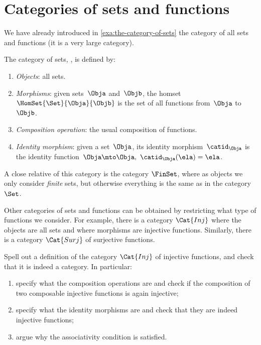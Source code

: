 
\section{Categories of sets and functions}

We have already introduced in \cref{exa:the-category-of-sets} the category of all sets and functions (it is a very large category).

\begin{ctdefinition}
    \label{def:Set}
    The category of sets, \iindex{\Set}, is defined by:
    \begin{enumerate}
        \item \emph{Objects}: all sets.
        \item \emph{Morphisms}: given sets~$\Obja$ and~$\Objb$, the homset~$\HomSet{\Set}{\Obja}{\Objb}$ is the set of all functions from~$\Obja$ to~$\Objb$.
        \item \emph{Composition operation}: the usual composition of functions.
        \item \emph{Identity morphism}: given a set~$\Obja$, its identity morphism~$\catid_\Obja$ is the identity function~$\Obja \mto \Obja, \ \catid_\Obja(\ela) = \ela$.
    \end{enumerate}
\end{ctdefinition}

A close relative of this category is the category $\FinSet$, where as objects we only consider \emph{finite} sets, but otherwise everything is the same as in the category $\Set$.

Other categories of sets and functions can be obtained by restricting what type of functions we consider.
For example, there is a category $\Cat{Inj}$ where the objects are all sets and where morphisms are injective functions.
Similarly, there is a category $\Cat{Surj}$ of surjective functions.

\begin{exercise}
    Spell out a definition of the category $\Cat{Inj}$ of injective functions, and check that it is indeed a category.
    In particular:
    \begin{enumerate}
        \item specify what the composition operations are and check if the composition of two composable injective functions is again injective;
        \item specify what the identity morphisms are and check that they are indeed injective functions;
        \item argue why the associativity condition is satisfied.
    \end{enumerate}
\end{exercise}

